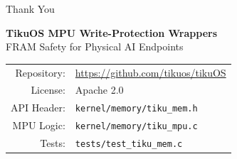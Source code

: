 \documentclass[aspectratio=169, 10pt]{beamer}
\begin{document}
\begin{frame}{Thank You}
\begin{center}
\Large\textbf{TikuOS MPU Write-Protection Wrappers}\\[0.5em]
\normalsize FRAM Safety for Physical AI Endpoints\\[1.5em]

\begin{tabular}{rl}
  Repository: & \url{https://github.com/tikuos/tikuOS} \\
  License:    & Apache 2.0 \\
  API Header: & \texttt{kernel/memory/tiku\_mem.h} \\
  MPU Logic:  & \texttt{kernel/memory/tiku\_mpu.c} \\
  Tests:      & \texttt{tests/test\_tiku\_mem.c} \\
\end{tabular}
\end{center}
\end{frame}
\end{document}
